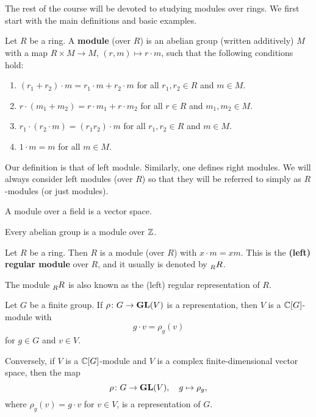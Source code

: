 \chapter{}


The rest of the course will be devoted to studying modules over rings. 
We first start with the main definitions and basic examples.

\begin{definition}
    Let $R$ be a ring. A \textbf{module} (over $R$) is an abelian group (written additively) 
    $M$ with a map $R\times M\to M$, $(r,m)\mapsto r\cdot m$, such that
    the following conditions hold:
    \begin{enumerate}
        \item $(r_1+r_2)\cdot m=r_1\cdot m+r_2\cdot m$ for all $r_1,r_2\in R$ and $m\in M$.
		\item $r\cdot (m_1+m_2)=r\cdot m_1+r\cdot m_2$ for all $r\in R$ and $m_1,m_2\in M$.
		\item $r_1\cdot (r_2\cdot m)=(r_1r_2)\cdot m$ for all $r_1,r_2\in R$ and $m\in M$.
		\item $1\cdot m=m$ for all $m\in M$.	
    \end{enumerate}
\end{definition}

Our definition is that of left module. Similarly, one defines right modules. We will always
consider left modules (over $R$) 
so that they will be referred to simply as $R$-modules (or just modules).

\begin{example}
A module over a field is a vector space. 
\end{example}

\begin{example}
Every abelian group is a module over $\mathbb{Z}$.	
\end{example}

\begin{example}
\label{exa:left_regular}
Let $R$ be a ring. Then $R$ is a module (over $R$) with $x\cdot m=xm$. 
This is the \textbf{(left) regular module} over $R$, and it usually 
is denoted by $\prescript{}{R}R$. 
\end{example}

The module $\prescript{}{R}R$ is also known as the (left) regular representation of $R$. 

\begin{example}
    Let $G$ be a finite group. If $\rho\colon G\to\mathbf{GL}(V)$ is a representation, 
    then $V$ is a $\mathbb{C}[G]$-module with 
    \[
    g\cdot v=\rho_g(v)
    \]
    for $g\in G$ and $v\in V$.
    
    Conversely, if $V$ is a $\mathbb{C}[G]$-module and $V$ is a complex 
    finite-dimensional vector space, then 
    the map
    \[
    \rho\colon G\to\mathbf{GL}(V),\quad g\mapsto\rho_g,
    \]
    where $\rho_g(v)=g\cdot v$ for $v\in V$, 
    is a representation of $G$. 
\end{example}

